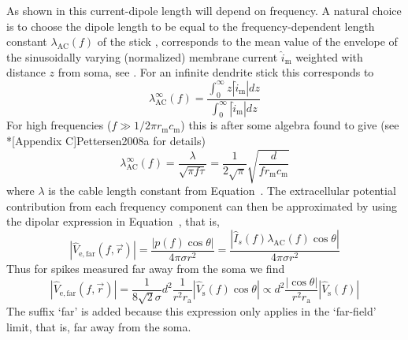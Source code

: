 As shown in  this current-dipole length will depend on frequency. 
A natural choice is to choose the dipole length to be equal to the frequency-dependent length constant 
$\lambda_\mathrm{AC}(f)$ of the stick , 
 corresponds to the mean value of the envelope of the sinusoidally varying (normalized) membrane current $\hat{i}_\mathrm{m}$ weighted with distance $z$ from soma, 
see . For an infinite dendrite stick this corresponds to
%
\begin{equation}
  \lambda_\mathrm{AC}^\infty(f) = \frac{\int_0^\infty z |\hat{i}_\mathrm{m}| dz}{\int_0^\infty |\hat{i}_\mathrm{m}| dz} 
  \label{eq:Spikes:formula_lambda_ac}
\end{equation}
%
For high frequencies ($f \gg 1/2 \pi r_\mathrm{m} c_\mathrm{m}$) this is after some algebra found to give (see \citeasnoun**[Appendix C]{Pettersen2008a} for details)
%
\begin{equation}
 \lambda_\mathrm{AC}^\infty(f) =  \frac{\lambda}{\sqrt{\pi f \tau}} = 
  \frac{1}{2\sqrt{\pi}} \sqrt{\frac{d}{f r_\mathrm{m} c_\mathrm{m}}}
\label{eq:Spikes:approx_lambda_ac}
\end{equation}
%
where $\lambda$ is the cable length constant from Equation~. The extracellular potential contribution from each frequency component can then be approximated by using the dipolar expression in Equation~, that is,
\begin{equation}
  |\hat{V}_\mathrm{e,far}(f,\vec{r})| =  \frac{|p(f) \cos \theta|}{4 \pi \sigma r^2} 
                                            = \frac{| \hat{I}_{s}(f) \lambda_\mathrm{AC}(f) \cos \theta|}{4 \pi \sigma r^2}   
                                                                                        \label{eq:Spikes:Ve_far_1}
\end{equation}
Thus for spikes measured far away from the soma we find 
%  
\begin{equation}
  |\hat{V}_\mathrm{e,far}(f,\vec{r})|  = \frac{1}{8 \sqrt{2} \sigma} d^{2} \frac{1}{r^2  r_\mathrm{a}} 
      |\hat{V}_\mathrm{s}(f) \cos \theta | 
  \propto d^{2} \frac{|\cos \theta|}{r^2  r_\mathrm{a}} |\hat{V}_\mathrm{s}(f)| 
  \label{eq:Spikes:Ve_far_2}
\end{equation}
The suffix `far' is added because this expression only applies in the `far-field' limit, that is, far away from the soma. 
